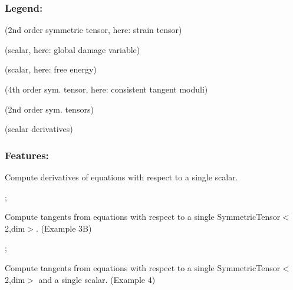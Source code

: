 \subsubsection*{Legend\+:}

\href{https://www.codecogs.com/eqnedit.php?latex=\boldsymbol{\varepsilon}}{\tt } (2nd order symmetric tensor, here\+: strain tensor)

\href{https://www.codecogs.com/eqnedit.php?latex=\varphi}{\tt } (scalar, here\+: global damage variable)

\href{https://www.codecogs.com/eqnedit.php?latex=\Psi&space;=&space;\Psi(\boldsymbol{\varepsilon},\varphi)}{\tt } (scalar, here\+: free energy)

\href{https://www.codecogs.com/eqnedit.php?latex=\overset{4}{C}}{\tt } (4th order sym. tensor, here\+: consistent tangent moduli)

\href{https://www.codecogs.com/eqnedit.php?latex=\boldsymbol{A,&space;B,&space;E,&space;F}}{\tt } (2nd order sym. tensors)

\href{https://www.codecogs.com/eqnedit.php?latex=D,&space;G}{\tt } (scalar derivatives)

\subsubsection*{Features\+:}


\begin{DoxyItemize}
\item Compute derivatives of equations with respect to a single scalar.
\end{DoxyItemize}

\href{https://www.codecogs.com/eqnedit.php?latex={D}&space;=&space;\frac{\partial{\alpha}}{\partial{\phi&space;}}}{\tt } ; \href{https://www.codecogs.com/eqnedit.php?latex=\boldsymbol{A}&space;=&space;\frac{\partial\boldsymbol{\sigma}}{\partial{\phi&space;}}}{\tt }


\begin{DoxyItemize}
\item Compute tangents from equations with respect to a single Symmetric\+Tensor$<$2,dim$>$. (Example 3B)

\href{https://www.codecogs.com/eqnedit.php?latex=\boldsymbol{B}&space;=&space;\frac{\partial{\phi}}{\partial\boldsymbol{\varepsilon&space;}}}{\tt } ; \href{https://www.codecogs.com/eqnedit.php?latex=\overset{4}{C}&space;=&space;\frac{\partial\boldsymbol{\sigma}}{\partial\boldsymbol{\varepsilon&space;}}}{\tt }
\item Compute tangents from equations with respect to a single Symmetric\+Tensor$<$2,dim$>$ and a single scalar. (Example 4)
\end{DoxyItemize}

